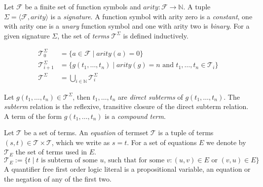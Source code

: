 \documentclass[smallextended]{svjour3}
\begin{document}
\begin{definition}

Let $\mathcal{F}$ be a finite set of function symbols and $arity: \mathcal{F} \rightarrow \mathbb{N}$.
A tuple $\Sigma = \langle \mathcal{F}, arity \rangle$ is a \emph{signature}.
A function symbol with arity zero is a \emph{constant}, one with arity one is a \emph{unary} function symbol and one with arity two is \emph{binary}.
For a given signature $\Sigma$, the set of \emph{terms} $\mathcal{T}^{\Sigma}$ is defined inductively.

\begin{align}
	\mathcal{T}^{\Sigma}_0 &= \{a \in \mathcal{F} \mid arity(a) = 0\}\\
	\mathcal{T}^{\Sigma}_{i+1} &= \{g(t_1,\ldots,t_n) \mid arity(g) = n \text{ and } t_1, \ldots, t_n \in \mathcal{T}_{i}\} \\
	\mathcal{T}^{\Sigma} &= \bigcup_{i\in \mathbb{N}} \mathcal{T}^{\Sigma}_{i}
\end{align}

\noindent Let $g(t_1,\ldots,t_n) \in \mathcal{T}^{\Sigma}$, then $t_1,\ldots,t_n$ are \emph{direct subterms} of $g(t_1,\ldots,t_n)$.
The \emph{subterm} relation is the reflexive, transitive closure of the direct subterm relation.
A term of the form $g(t_1,\ldots,t_n)$ is a \emph{compound term}.

\end{definition}

%
%
Let $\mathcal{T}$ be a set of terms.
An \emph{equation} of termset $\mathcal{T}$ is a tuple of terms $(s,t) \in \mathcal{T} \times \mathcal{T}$, which we write as $s=t$.
For a set of equations $E$ we denote by $\mathcal{T}_E$ the set of terms used in $E$.
$$\mathcal{T}_E := \{t \mid t \text{ is subterm of some } u \text{, such that for some } v: (u,v) \in E \text{ or } (v,u) \in E\}$$
A quantifier free first order logic literal is a propositional variable, an equation or the negation of any of the first two.
\end{document}
